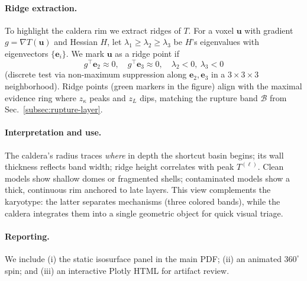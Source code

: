 \documentclass[11pt]{article}
\begin{document}
\paragraph{Ridge extraction.}
To highlight the caldera rim we extract ridges of $T$. For a voxel $\mathbf{u}$ with gradient $g=\nabla T(\mathbf{u})$ and Hessian $H$, let $\lambda_1\ge\lambda_2\ge\lambda_3$ be $H$’s eigenvalues with eigenvectors $\{\mathbf{e}_i\}$. We mark $\mathbf{u}$ as a ridge point if
\[
g^\top \mathbf{e}_2 \approx 0,\quad g^\top \mathbf{e}_3 \approx 0,\quad \lambda_2<0,\ \lambda_3<0
\]
(discrete test via non-maximum suppression along $\mathbf{e}_2,\mathbf{e}_3$ in a $3{\times}3{\times}3$ neighborhood).
Ridge points (green markers in the figure) align with the maximal evidence ring where $z_\kappa$ peaks and $z_L$ dips, matching the rupture band $\mathcal{B}$ from Sec.~\ref{subsec:rupture-layer}.

\paragraph{Interpretation and use.}
The caldera’s radius traces \emph{where} in depth the shortcut basin begins; its wall thickness reflects band width; ridge height correlates with peak $T^{(\ell)}$.
Clean models show shallow domes or fragmented shells; contaminated models show a thick, continuous rim anchored to late layers.
This view complements the karyotype: the latter separates mechanisms (three colored bands), while the caldera integrates them into a single geometric object for quick visual triage.

\paragraph{Reporting.}
We include (i) the static isosurface panel in the main PDF; (ii) an animated $360^\circ$ spin; and (iii) an interactive Plotly HTML for artifact review.%
\end{document}

